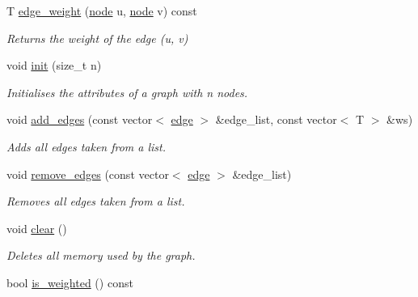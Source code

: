\begin{DoxyCompactItemize}
T \hyperlink{classlgraph_1_1utils_1_1wugraph_ace598c9cb108806a2a9a6ff4219377de}{edge\+\_\+weight} (\hyperlink{namespacelgraph_1_1utils_a7bd66ede3805ef121bc2835bd48de0cf}{node} u, \hyperlink{namespacelgraph_1_1utils_a7bd66ede3805ef121bc2835bd48de0cf}{node} v) const 
\begin{DoxyCompactList}\small\item\em Returns the weight of the edge ({\itshape u}, {\itshape v}) \end{DoxyCompactList}\item 
void \hyperlink{classlgraph_1_1utils_1_1wxgraph_a566ae9fe69209230ef159ed350ab8f7f}{init} (size\+\_\+t n)
\begin{DoxyCompactList}\small\item\em Initialises the attributes of a graph with {\itshape n} nodes. \end{DoxyCompactList}\item 
void \hyperlink{classlgraph_1_1utils_1_1wxgraph_a972a2483966f4b1d485c5d14157ee9be}{add\+\_\+edges} (const vector$<$ \hyperlink{namespacelgraph_1_1utils_a6510284ce1b1ae5dc97ce5d2de426e10}{edge} $>$ \&edge\+\_\+list, const vector$<$ T $>$ \&ws)
\begin{DoxyCompactList}\small\item\em Adds all edges taken from a list. \end{DoxyCompactList}\item 
void \hyperlink{classlgraph_1_1utils_1_1wxgraph_a4188b82f50e962b28c2c076b7978a854}{remove\+\_\+edges} (const vector$<$ \hyperlink{namespacelgraph_1_1utils_a6510284ce1b1ae5dc97ce5d2de426e10}{edge} $>$ \&edge\+\_\+list)
\begin{DoxyCompactList}\small\item\em Removes all edges taken from a list. \end{DoxyCompactList}\item 
void \hyperlink{classlgraph_1_1utils_1_1wxgraph_a421bc8166e35335445e45efc680ebe3f}{clear} ()
\begin{DoxyCompactList}\small\item\em Deletes all memory used by the graph. \end{DoxyCompactList}\item 
bool \hyperlink{classlgraph_1_1utils_1_1wxgraph_adda596cfbf72080d46ab445679fe092f}{is\+\_\+weighted} () const \hypertarget{classlgraph_1_1utils_1_1wxgraph_adda596cfbf72080d46ab445679fe092f}{}\label{classlgraph_1_1utils_1_1wxgraph_adda596cfbf72080d46ab445679fe092f}


\end{DoxyCompactItemize}
